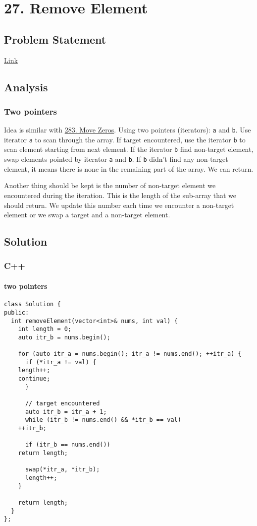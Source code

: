 \documentclass[12pt]{article}
\begin{document}
\section{27. Remove Element \label{orgda83898}}
\label{sec:org616fa1e}
\subsection{Problem Statement}
\label{sec:org6b2f451}
\href{https://leetcode.com/problems/remove-element/}{Link}
\subsection{Analysis}
\label{sec:org2e8e74f}
\subsubsection{Two pointers}
\label{sec:org0315274}
Idea is similar with \hyperref[org5a46fa9]{283. Move Zeros}. Using two pointers (iterators): \texttt{a} and \texttt{b}. Use iterator \texttt{a} to scan through the array. If target encountered, use the iterator \texttt{b} to scan element starting from next element. If the iterator \texttt{b} find non-target element, swap elements pointed by iterator \texttt{a} and \texttt{b}. If \texttt{b} didn't find any non-target element, it means there is none in the remaining part of the array. We can return.

Another thing should be kept is the number of non-target element we encountered during the iteration. This is the length of the sub-array that we should return. We update this number each time we encounter a non-target element or we swap a target and a non-target element.

\subsection{Solution}
\label{sec:orgdf9645c}
\subsubsection{C++}
\label{sec:org723e18f}
\paragraph{two pointers}
\label{sec:org0eaeec1}
\begin{verbatim}
class Solution {
public:
  int removeElement(vector<int>& nums, int val) {
    int length = 0;
    auto itr_b = nums.begin();

    for (auto itr_a = nums.begin(); itr_a != nums.end(); ++itr_a) {
      if (*itr_a != val) {
	length++;
	continue;
      }

      // target encountered
      auto itr_b = itr_a + 1;
      while (itr_b != nums.end() && *itr_b == val)
	++itr_b;

      if (itr_b == nums.end())
	return length;

      swap(*itr_a, *itr_b);
      length++;
    }

    return length;
  }
};
\end{verbatim}
\end{document}
